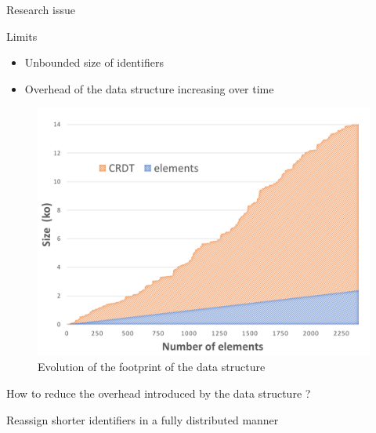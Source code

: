 \documentclass[10pt]{beamer}
\begin{document}
\begin{frame}{Research issue}
  \begin{alertblock}{Limits}
    \begin{itemize}
      \item Unbounded size of identifiers
      \item Overhead of the data structure increasing over time
    \end{itemize}
  \end{alertblock}

  \begin{figure}
    \includegraphics[scale=0.22]{img/footprint-4.png}
    \caption{Evolution of the footprint of the data structure}
  \end{figure}
\end{frame}

\begin{frame}[standout]
  \alert{How to reduce the overhead introduced by the data structure ?}

  \bigskip
  \pause

  Reassign shorter identifiers in a fully distributed manner
\end{frame}
\end{document}
